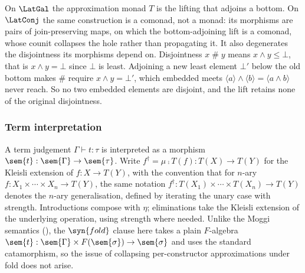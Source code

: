 \begin{remark}
\label{rem:slicing-interpretation:no-conjugate-lift}
On $\LatGal$ the approximation monad $T$ is the lifting that adjoins a bottom. On $\LatConj$ the same
construction is a comonad, not a monad: its morphisms are pairs of join-preserving maps, on which the
bottom-adjoining lift is a comonad, whose counit collapses the hole rather than propagating it. It also
degenerates the disjointness its morphisms depend on.
Disjointness $x \mathrel{\#} y$ means $x \wedge y \le \bot$, that is $x \wedge y = \bot$ since $\bot$ is
least. Adjoining a new least element $\bot'$ below the old bottom
makes $\#$ require $x \wedge y = \bot'$, which embedded meets $\langle a \rangle \wedge \langle b \rangle =
\langle a \wedge b \rangle$ never reach. So no two embedded elements are disjoint, and the lift retains
none of the original disjointness.
\end{remark}

\subsubsection{Term interpretation}
\label{sec:slicing-interpretation:terms}

A term judgement $\Gamma \vdash t : \tau$ is interpreted as a morphism $\sem{t} : \sem{\Gamma} \to
\sem{\tau}$. Write $f^\dagger = \mu \comp T(f) : T(X) \to T(Y)$ for the Kleisli extension of $f :
X \to T(Y)$, with the convention that for $n$-ary $f : X_1 \times \cdots \times X_n \to T(Y)$,
the same notation $f^\dagger : T(X_1) \times \cdots \times T(X_n) \to T(Y)$ denotes the $n$-ary
generalisation, defined by iterating the unary case with strength. Introductions compose with
$\eta$; eliminations take the Kleisli extension of the underlying operation, using strength
where needed. Unlike the Moggi semantics (),
the $\syn{fold}$ clause here takes a plain $F$-algebra $\sem{t} : \sem{\Gamma} \times F(\sem{\sigma}) \to
\sem{\sigma}$ and uses the standard catamorphism, so the issue of collapsing per-constructor
approximations under fold does not arise.

